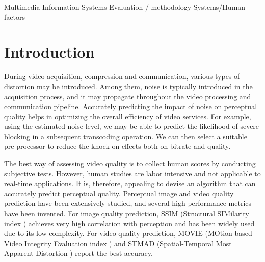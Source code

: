 \documentclass{sig-alternate}
\begin{document}
{Multimedia Information Systems Evaluation / methodology}
 {Systems/Human factors}


\section{Introduction}
During video acquisition, compression and communication, various types of distortion may be introduced. Among them, noise is typically introduced in the acquisition process, and it may propagate throughout the video processing and communication pipeline. Accurately predicting the impact of noise on perceptual quality helps in optimizing the overall efficiency of video services. For example, using the estimated noise level, we may be able to predict the likelihood of severe blocking in a subsequent transcoding operation\cite{AlMer1999}. We can then select a suitable pre-processor to reduce the knock-on effects both on bitrate and quality.

The best way of assessing video quality is to collect human scores by conducting subjective tests. However, human studies are labor intensive and not applicable to real-time applications. It is, therefore, appealing to devise an algorithm that can accurately predict perceptual quality. Perceptual image and video quality prediction have been extensively studied, and several high-performance metrics have been invented. For image quality prediction, SSIM (Structural SIMilarity index \cite{SSIM}) achieves very high correlation with perception and has been widely used due to its low complexity. For video quality prediction, MOVIE (MOtion-based Video Integrity Evaluation index \cite{MOVIE}) and STMAD (Spatial-Temporal Most Apparent Distortion \cite{STMAD}) report the best accuracy. 
\end{document}
